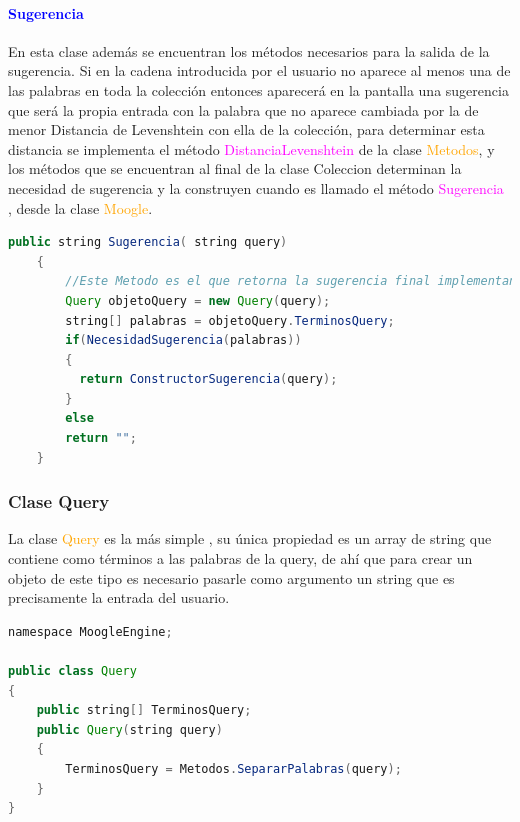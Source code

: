 \documentclass[a4paper, 12pt]{article}
\begin{document}
\paragraph{\textcolor{blue}{Sugerencia} }\label{sub:center}
En esta clase además se encuentran los métodos necesarios para la salida de la sugerencia. Si en la cadena introducida por el usuario no aparece al menos una de las palabras en toda la colección entonces aparecerá en la pantalla una sugerencia que será la propia entrada con la palabra que no aparece cambiada por la de menor Distancia de Levenshtein con ella de la colección, para determinar esta distancia se implementa el método \textcolor{magenta}{DistanciaLevenshtein} de la clase \textcolor{orange}{Metodos}, y los métodos que se encuentran al final de la clase Coleccion determinan la necesidad de sugerencia y la construyen cuando es llamado el método  \textcolor{magenta}{Sugerencia} , desde la clase \textcolor{orange}{Moogle}. 
\begin{lstlisting}[language=Java]
public string Sugerencia( string query)
    {
        //Este Metodo es el que retorna la sugerencia final implementando todos los anteriores y es llamado desde Moogle
        Query objetoQuery = new Query(query);
        string[] palabras = objetoQuery.TerminosQuery;
        if(NecesidadSugerencia(palabras))
        {
          return ConstructorSugerencia(query); 
        }
        else
        return "";
    }
\end{lstlisting}

\subsubsection{Clase Query}\label{sub;query}
La clase \textcolor{orange}{Query} es la más simple , su única propiedad es un array de string que contiene como términos a las palabras de la query, de ahí que para crear un objeto de este tipo es necesario pasarle como argumento un string que es precisamente la entrada del usuario.
\begin{lstlisting}[language=Java]
namespace MoogleEngine;

public class Query
{
    public string[] TerminosQuery;
    public Query(string query)
    {
        TerminosQuery = Metodos.SepararPalabras(query);
    }
}
\end{lstlisting}
\end{document}
